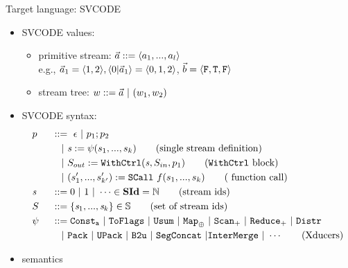 \documentclass{beamer}
\begin{document}
\begin{frame}{Target language: SVCODE}
	\begin{itemize}
	\item SVCODE values:
		\begin{itemize}
			\item primitive stream: $\a ::= \<a_1,...,a_l\'>$ \\ 
			e.g., $\a_1 = \<1,2\'>,  \<0 | \a_1 \'> = \<0,1,2\'>$, $\b = \<\F, \T , \F\'>$
			\item stream tree: $w ::= \a \ | \ (w_1,w_2)$
		\end{itemize}
		
	\item SVCODE syntax:
		{\footnotesize \begin{alignat*}{2} 
		&p  && :: = \ \epsilon \ | \ p_1;p_2 \\ 
		&   && \quad | \ \sdef{\s}{\psi(s_1,...,s_k)}  \tag{single stream definition}\\
		&   && \quad | \ \withctrl{\s}{p_1}{\Sin}{\Sout}  \tag{\wc block}\\
		&   && \quad | \ \scall{f}{s_1,...,s_k}{(s_1',...,s_{k'}')} \tag{ function call}\\
		&\s && ::= 0 \ | \ 1 \ | \ \cdots \in \SId  = \mathbb{N}   \tag{stream ids}\\
		&  \S && ::= \{\s_1,..., \s_k\} \in \sset  \tag{set of stream ids}\\
		& \psi \ && ::= \consta{a} \ | \ \toflag  
		\ | \ \usum \ | \ \map{\oplus} \ | \ \genscan_{+} \ | \ \genreduce_{+} \ | \ \distr    \\
		&   && \quad  | \ \pack \ | \ \upack \ | \ \bu \ | \ \segconcat \ | \intermerge \ | \ \cdots  \tag{Xducers} \\	
		\end{alignat*}}
		
		\item semantics
	\end{itemize}
\end{frame}
\end{document}
